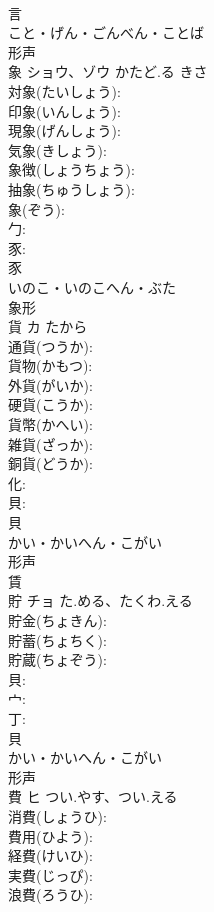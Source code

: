 \documentclass[8pt]{extreport}
\begin{document}
\begin{CJK}{UTF8}{min}
\\	言	
\\	こと・げん・ごんべん・ことば	
\\	形声 
\\	象	ショウ、ゾウ	かたど.る	きさ	
\\	対象(たいしょう): 
\\	印象(いんしょう): 
\\	現象(げんしょう): 
\\	気象(きしょう): 
\\	象徴(しょうちょう): 
\\	抽象(ちゅうしょう): 
\\	象(ぞう): 
\\	勹: 
\\	豕: 
\\	豕	
\\	いのこ・いのこへん・ぶた	
\\	象形 
\\	貨	カ	たから		
\\	通貨(つうか): 
\\	貨物(かもつ): 
\\	外貨(がいか): 
\\	硬貨(こうか): 
\\	貨幣(かへい): 
\\	雑貨(ざっか): 
\\	銅貨(どうか): 
\\	化: 
\\	貝: 
\\	貝	
\\	かい・かいへん・こがい	
\\	形声 
\\	賃 
\\	貯	チョ	た.める、たくわ.える		
\\	貯金(ちょきん): 
\\	貯蓄(ちょちく): 
\\	貯蔵(ちょぞう): 
\\	貝: 
\\	宀: 
\\	丁: 
\\	貝	
\\	かい・かいへん・こがい	
\\	形声 
\\	費	ヒ	つい.やす、つい.える		
\\	消費(しょうひ): 
\\	費用(ひよう): 
\\	経費(けいひ): 
\\	実費(じっぴ): 
\\	浪費(ろうひ): 

\end{CJK}
\end{document}
